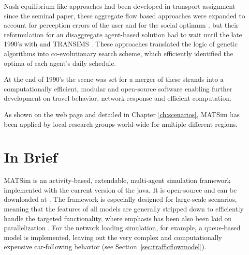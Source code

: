 


Nash-equilibrium-like approaches had been developed in transport assignment since the seminal \citet[][]{Wardrop_PICE_1952} paper, these aggregate flow based approaches were expanded to account for perception errors of the user and for the social optimum \citep[see][]{DaganzoSheffi_TransScience_1977}, but their reformulation for an disaggregate agent-based solution had to wait until the late 1990’s with \citet[][]{Gawron_IJMPC_1998} and TRANSIMS \citep[][]{SmithEtAl_NTRPAC_1995}. These approaches translated the logic of genetic algorithms into co-evolutionary search scheme, which efficiently identified the optima of each agent’s daily schedule.

At the end of 1990’s the scene was set for a merger of these strands into a computationally efficient, modular and open-source software enabling further development on travel behavior, network response and efficient computation. 

As shown on the web page \citet[][]{MATSIM-T-Scenarios_Webpage_2015} and detailed in Chapter \ref{ch:scenarios}, MATSim has been applied by local research groups world-wide for multiple different regions. 

\section{In Brief}
\label{sec:inbrief}
MATSim is an activity-based, extendable, multi-agent simulation \gls{framework} 
implemented with the current version of the \gls{java}. It is open-source and can be downloaded at \citep[][]{MATSIM-T_Webpage_2015, SourceForge_Webpage_2015}. The framework is especially designed for large-scale scenarios, meaning that the features of all models are generally stripped down to efficiently handle the targeted functionality, where emphasis has been also been laid on parallelization \citep[e.g.,][]{Dobler_TechRep_IVT_2011, Charypar_PhDThesis_2008}. For the network loading simulation, for example, a queue-based model is implemented, leaving out the very complex and computationally expensive car-following behavior (see Section~\ref{sec:trafficflowmodel}).

